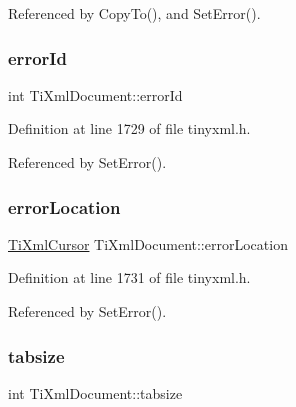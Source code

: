Referenced by Copy\+To(), and Set\+Error().

\hypertarget{class_ti_xml_document_acdef97a4bb80729ac6863dd54cee7eeb}{}\label{class_ti_xml_document_acdef97a4bb80729ac6863dd54cee7eeb} 
\subsubsection{\texorpdfstring{error\+Id}{errorId}}
{\footnotesize\ttfamily int Ti\+Xml\+Document\+::error\+Id\hspace{0.3cm}{\ttfamily [private]}}



Definition at line 1729 of file tinyxml.\+h.



Referenced by Set\+Error().

\hypertarget{class_ti_xml_document_aa4030f989f1549f6b897147fc2851d1a}{}\label{class_ti_xml_document_aa4030f989f1549f6b897147fc2851d1a} 
\subsubsection{\texorpdfstring{error\+Location}{errorLocation}}
{\footnotesize\ttfamily \hyperlink{struct_ti_xml_cursor}{Ti\+Xml\+Cursor} Ti\+Xml\+Document\+::error\+Location\hspace{0.3cm}{\ttfamily [private]}}



Definition at line 1731 of file tinyxml.\+h.



Referenced by Set\+Error().

\hypertarget{class_ti_xml_document_af2fa6a010b903d893d52cc6fee5575a1}{}\label{class_ti_xml_document_af2fa6a010b903d893d52cc6fee5575a1} 
\subsubsection{\texorpdfstring{tabsize}{tabsize}}
{\footnotesize\ttfamily int Ti\+Xml\+Document\+::tabsize\hspace{0.3cm}{\ttfamily [private]}}



